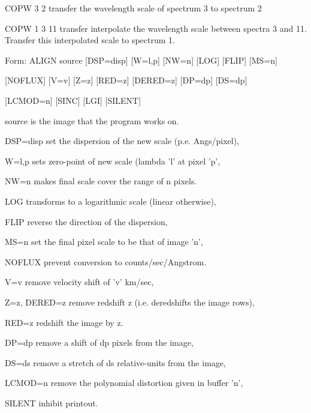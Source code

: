 {\newpage\clearpage
{}%
\begin{example}
  \item[COPW 3 2\hfill]{transfer the wavelength scale of spectrum 3 to
       spectrum 2}
\par
\item[COPW 1 3 11\hfill]{transfer interpolate the wavelength scale
       between spectra 3 and 11.  Transfer this interpolated scale to
       spectrum 1.}
\end{example}%
\lthtmlfigureZ
\lthtmlcheckvsize\clearpage}

{\newpage\clearpage
{}%
\begin{command}
  \item[Form: ALIGN source {[DSP=disp]} {[W=l,p]} {[NW=n]} {[LOG]} 
       {[FLIP]} {[MS=n]}\hfill]{}
  \item{{[NOFLUX]} {[V=v]} {[Z=z]} {[RED=z]} {[DERED=z]} {[DP=dp]} {[DS=dp]}}
  \item{{[LCMOD=n]} {[SINC]} {[LGI]} {[SILENT]}}
  \item[source]{is the image that the program works on.}
  \item[DSP=disp]{set the dispersion of the new scale (p.e. Angs/pixel),}
  \item[W=l,p]{sets zero-point of new scale (lambda 'l' at pixel 'p',}
  \item[NW=n]{makes final scale cover the range of n pixels.}
  \item[LOG]{transforms to a logarithmic scale (linear otherwise),}
  \item[FLIP]{reverse the direction of the dispersion,}
  \item[MS=n]{set the final pixel scale to be that of image 'n',}
  \item[NOFLUX]{prevent conversion to counts/sec/Angstrom.}
  \item[V=v]{remove velocity shift of 'v' km/sec,}
  \item[Z=z, DERED=z]{remove redshift z (i.e. deredshifts the image rows),}
  \item[RED=z]{redshift the image by z.}
  \item[DP=dp]{remove a shift of dp pixels from the image,}
  \item[DS=ds]{remove a stretch of ds relative-units from the image,}
  \item[LCMOD=n]{remove the polynomial distortion given in buffer 'n',}
  \item[SILENT]{inhibit printout.}
\end{command}%
\lthtmlfigureZ
\lthtmlcheckvsize\clearpage}

